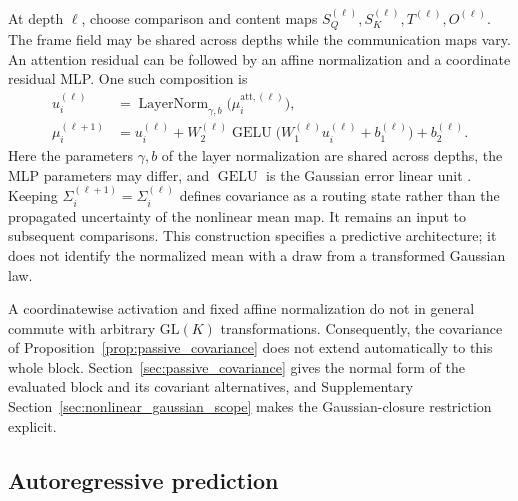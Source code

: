 \documentclass[twoside,11pt]{article}
\begin{document}
At depth \(\ell\), choose comparison and content maps \(S_Q^{(\ell)},S_K^{(\ell)},T^{(\ell)},O^{(\ell)}\). The frame field may be shared across depths while the communication maps vary. An attention residual can be followed by an affine normalization and a coordinate residual MLP. One such composition is
\begin{align}
u_i^{(\ell)}&=\operatorname{LayerNorm}_{\gamma,b}
 \bigl(\mu_i^{\mathrm{att},(\ell)}\bigr),\\
\mu_i^{(\ell+1)}&=u_i^{(\ell)}
+W_2^{(\ell)}\operatorname{GELU}\bigl(W_1^{(\ell)}u_i^{(\ell)}+b_1^{(\ell)}\bigr)
+b_2^{(\ell)}.
\label{eq:relational_block_composition}
\end{align}
Here the parameters \(\gamma,b\) of the layer normalization \citep{ba2016layernorm} are shared across depths, the MLP parameters may differ, and \(\operatorname{GELU}\) is the Gaussian error linear unit \citep{hendrycks2016gaussian}. Keeping \(\Sigma_i^{(\ell+1)}=\Sigma_i^{(\ell)}\) defines covariance as a routing state rather than the propagated uncertainty of the nonlinear mean map. It remains an input to subsequent comparisons. This construction specifies a predictive architecture; it does not identify the normalized mean with a draw from a transformed Gaussian law.

A coordinatewise activation and fixed affine normalization do not in general commute with arbitrary \(\mathrm{GL}(K)\) transformations. Consequently, the covariance of Proposition~\ref{prop:passive_covariance} does not extend automatically to this whole block. Section~\ref{sec:passive_covariance} gives the normal form of the evaluated block and its covariant alternatives, and Supplementary Section~\ref{sec:nonlinear_gaussian_scope} makes the Gaussian-closure restriction explicit.


\subsection{Autoregressive prediction}
\label{sec:autoregressive_prediction}
\end{document}
